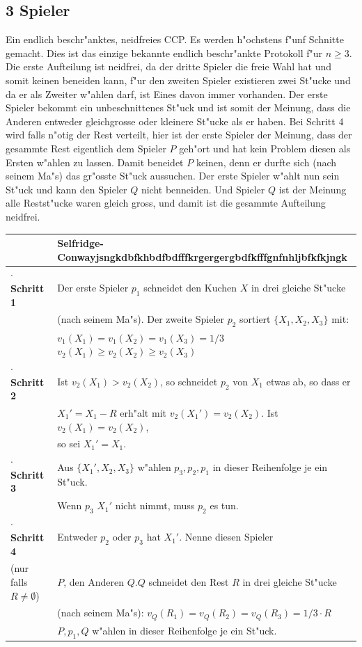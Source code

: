 \documentclass[11pt, a4paper, twoside]{article}
\newcommand{\wf}{\color{white}}
\newcommand{\tf}{\color{black}}
\numberwithin{equation}{section}
\begin{document}
\subsection{3 Spieler}
Ein endlich beschr"anktes, neidfreies CCP. Es werden h"ochstens f"unf Schnitte gemacht. Dies ist das einzige bekannte endlich beschr"ankte Protokoll f"ur $n \geq 3$.\\ Die erste Aufteilung ist neidfrei, da der dritte Spieler die freie Wahl hat und somit keinen beneiden kann, f"ur den zweiten Spieler existieren zwei St"ucke und da er als Zweiter w"ahlen darf, ist Eines davon immer vorhanden. Der erste Spieler bekommt ein unbeschnittenes St"uck und ist somit der Meinung, dass die Anderen entweder gleichgrosse oder kleinere St"ucke als er haben. Bei Schritt 4 wird falls n"otig der Rest verteilt, hier ist der erste Spieler der Meinung, dass der gesammte Rest eigentlich dem Spieler $P$ geh"ort und hat kein Problem diesen als Ersten w"ahlen zu lassen. Damit beneidet $P$ keinen, denn er durfte sich (nach seinem Ma"s) das gr"osste St"uck aussuchen. Der erste Spieler w"ahlt nun  sein St"uck und kann den Spieler $Q$ nicht benneiden. Und Spieler $Q$ ist der Meinung alle Restst"ucke waren gleich gross, und damit ist die gesammte Aufteilung neidfrei.\\  
\newline
\begin{tabular}{|ll|}
\hline
&\textbf{Selfridge-Conway}\wf jsngkdbfkhbdfbdfffkrgergergbdfkfffgnfnhljbfkfkjngk\tf\\
\hline
\textbf{$\cdot$ Schritt 1}&Der erste Spieler $p_1$ schneidet den Kuchen $X$ in drei gleiche St"ucke\\&(nach seinem Ma"s). Der zweite Spieler $p_2$ sortiert $\{X_1,X_2,X_3\}$ mit:\\
& $v_1(X_1)=v_1(X_2)=v_1(X_3)=1/3$ $v_2(X_1) \geq v_2(X_2) \geq v_2(X_3)$\\
\textbf{$\cdot$ Schritt 2}& Ist $v_2(X_1)>v_2(X_2)$, so schneidet $p_2$ von $X_1$ etwas ab, so dass er\\&$X_1'=X_1-R$ erh"alt mit   $v_2(X_1')=v_2(X_2)$. Ist $v_2(X_1)=v_2(X_2)$,\\&so sei $X_1'=X_1$.\\
\textbf{$\cdot$ Schritt 3}&Aus $\{X_1',X_2,X_3\}$ w"ahlen $p_3,p_2,p_1$ in dieser Reihenfolge je ein St"uck.\\&Wenn $p_3$ $X_1'$ nicht nimmt, muss $p_2$ es tun.\\
\textbf{$\cdot$ Schritt 4}& Entweder $p_2$ oder $p_3$ hat $X_1'$. Nenne diesen Spieler\\(nur falls $R \neq \emptyset$)&$P$, den Anderen $Q$.$Q$ schneidet den Rest $R$ in drei gleiche St"ucke\\&(nach seinem Ma"s): $v_Q(R_1)=v_Q(R_2)=v_Q(R_3)=1/3 \cdot R$\\& $P,p_1,Q$ w"ahlen in dieser Reihenfolge je ein St"uck.\\
\hline
\end{tabular}
\end{document}
